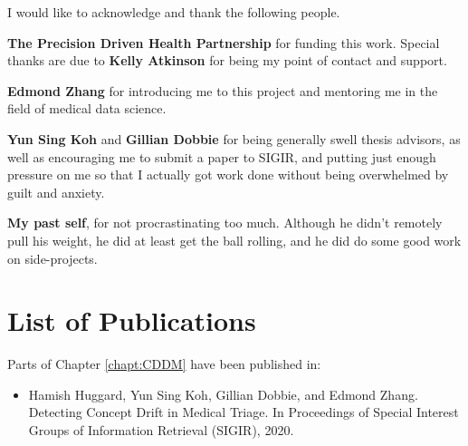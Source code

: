 \documentclass[12pt,examcopy]{uathesis}
\begin{document}
\begin{acknowledgements}
I would like to acknowledge and thank the following people.

{\bf The Precision Driven Health Partnership} for funding this work. Special thanks are due to {\bf Kelly Atkinson} for being my point of contact and support.

{\bf Edmond Zhang} for introducing me to this project and mentoring me in the field of medical data science. 

{\bf Yun Sing Koh} and {\bf Gillian Dobbie} for being generally swell thesis advisors, as well as encouraging me to submit a paper to SIGIR, and putting just enough pressure on me so that I actually got work done without being overwhelmed by guilt and anxiety. 

{\bf My past self}, for not procrastinating too much. Although he didn't remotely pull his weight, he did at least get the ball rolling, and he did do some good work on side-projects.
\end{acknowledgements}

\chapter*{List of Publications}

Parts of Chapter \ref{chapt:CDDM} have been published in:
\begin{itemize}
    \item Hamish Huggard, Yun Sing Koh, Gillian Dobbie, and Edmond Zhang. Detecting Concept Drift in Medical Triage. In Proceedings of Special Interest Groups of Information Retrieval (SIGIR), 2020.
\end{itemize}

\setcounter{tocdepth}{1}
\tableofcontents

\listoffigures

\listoftables

\listofalgorithms

\mainmatter








\backmatter


\end{document}
